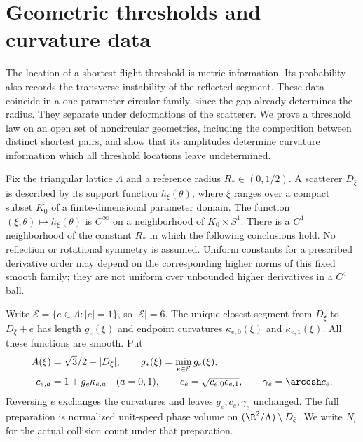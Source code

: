 \section{Geometric thresholds and curvature data}
\label{sec:geometric-results}
The location of a shortest-flight threshold is metric information. Its
probability also records the transverse instability of the reflected
segment. These data coincide in a one-parameter circular family, since
the gap already determines the radius. They separate under deformations
of the scatterer. We prove a threshold law on an open set of noncircular
geometries, including the competition between distinct shortest pairs,
and show that its amplitudes determine curvature information which all
threshold locations leave undetermined.

Fix the triangular lattice $\Lambda$ and a reference radius
$R_*\in(0,1/2)$. A scatterer $D_\xi$ is described by its support function
$h_\xi(\theta)$, where $\xi$ ranges over a compact subset $K_0$ of a
finite-dimensional parameter domain. The function $(\xi,\theta)\mapsto
h_\xi(\theta)$ is $C^\infty$ on a neighborhood of $K_0\times S^1$.
There is a $C^4$ neighborhood of the constant $R_*$ in which the
following conclusions hold. No reflection or rotational symmetry is
assumed. Uniform constants for a prescribed derivative order may depend
on the corresponding higher norms of this fixed smooth family; they are
not uniform over unbounded higher derivatives in a $C^4$ ball.

Write $\mathcal E=\{e\in\Lambda:|e|=1\}$, so $|\mathcal E|=6$.
The unique closest segment from $D_\xi$ to $D_\xi+e$ has length
$g_e(\xi)$ and endpoint curvatures $\kappa_{e,0}(\xi)$ and
$\kappa_{e,1}(\xi)$. All these functions are smooth. Put
\begin{equation}\label{eq:g-general-data}
 \begin{split}
 A(\xi)&=\sqrt3/2-|D_\xi|,\qquad g_*(\xi)=\min_{e\in\mathcal E}g_e(\xi),\\
 c_{e,a}&=1+g_e\kappa_{e,a}\quad(a=0,1),\qquad
 c_e=\sqrt{c_{e,0}c_{e,1}},\qquad \gamma_e=\arcosh c_e.
 \end{split}
\end{equation}
Reversing $e$ exchanges the curvatures and leaves $g_e,c_e,\gamma_e$
unchanged. The full preparation is normalized unit-speed phase volume
on $(\R^2/\Lambda)\setminus D_\xi$. We write $N_t$ for the actual
collision count under that preparation.

